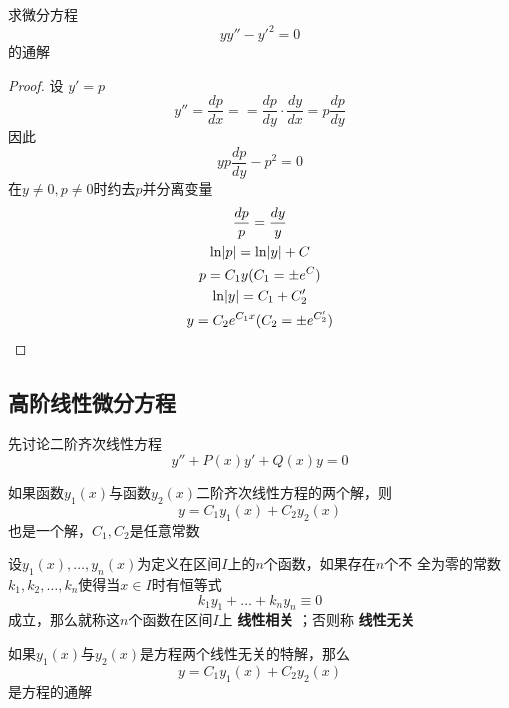\documentclass[11pt]{article}
\begin{document}
\begin{proposition}[]
求微分方程
\begin{equation*}
yy''-y'^2=0
\end{equation*}
的通解
\end{proposition}

\begin{proof}
设 \(y'=p\)
\begin{equation*}
y''=\frac{dp}{dx}==\frac{dp}{dy}\cdot\frac{dy}{dx}=p\frac{dp}{dy}
\end{equation*}
因此
\begin{equation*}
yp\frac{dp}{dy}-p^2=0
\end{equation*}
在\(y\neq0,p\neq0\)时约去\(p\)并分离变量
\begin{gather*}
\frac{dp}{p}=\frac{dy}{y}\\
\ln\abs{p}=\ln\abs{y}+C\\
p=C_1y(C_1=\pm e^C)\\
\ln\abs{y}=C_1+C_2'\\
y=C_2e^{C_1x}(C_2=\pm e^{C_2'})
\end{gather*}
\end{proof}
\subsection{高阶线性微分方程}
\label{sec:org155e53d}
先讨论二阶齐次线性方程
\begin{equation*}
y''+P(x)y'+Q(x)y=0
\end{equation*}
\begin{theorem}[]
如果函数\(y_1(x)\)与函数\(y_2(x)\)二阶齐次线性方程的两个解，则
\begin{equation*}
y=C_1y_1(x)+C_2y_2(x)
\end{equation*}
也是一个解，\(C_1,C_2\)是任意常数
\end{theorem}

设\(y_1(x),\dots,y_n(x)\)为定义在区间\(I\)上的\(n\)个函数，如果存在\(n\)个不
全为零的常数\(k_1,k_2,\dots,k_n\)使得当\(x\in I\)时有恒等式
\begin{equation*}
k_1y_1+\dots+k_ny_n\equiv0
\end{equation*}
成立，那么就称这\(n\)个函数在区间\(I\)上 \textbf{线性相关} ；否则称 \textbf{线性无关}

\begin{theorem}[]
如果\(y_1(x)\)与\(y_2(x)\)是方程两个线性无关的特解，那么
\begin{equation*}
y=C_1y_1(x)+C_2y_2(x)
\end{equation*}
是方程的通解
\end{theorem}
\end{document}
